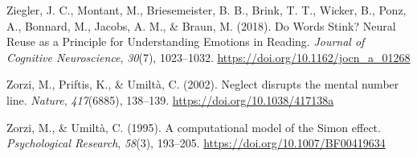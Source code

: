 \documentclass[
  a4paper,12pt,twoside,onecolumn,openright,final,oldfontcommands]{memoir}
\newlength{\cslhangindent}
\newlength{\cslentryspacingunit} %
\newenvironment{CSLReferences}[2] %
 {%
  \setlength{\parindent}{0pt}
  \ifodd #1
  \let\oldpar\par
  \def\par{\hangindent=\cslhangindent\oldpar}
  \fi
  \setlength{\parskip}{#2\cslentryspacingunit}
 }%
 {}
\begin{document}
\begin{CSLReferences}{1}{0}
\leavevmode{}%
Ziegler, J. C., Montant, M., Briesemeister, B. B., Brink, T. T., Wicker, B., Ponz, A., Bonnard, M., Jacobs, A. M., \& Braun, M. (2018). Do {Words} {Stink}? {Neural} {Reuse} as a {Principle} for {Understanding} {Emotions} in {Reading}. \emph{Journal of Cognitive Neuroscience}, \emph{30}(7), 1023--1032. \url{https://doi.org/10.1162/jocn_a_01268}

\leavevmode{}%
Zorzi, M., Priftis, K., \& Umiltà, C. (2002). Neglect disrupts the mental number line. \emph{Nature}, \emph{417}(6885), 138--139. \url{https://doi.org/10.1038/417138a}

\leavevmode{}%
Zorzi, M., \& Umiltà, C. (1995). A computational model of the {Simon} effect. \emph{Psychological Research}, \emph{58}(3), 193--205. \url{https://doi.org/10.1007/BF00419634}

\end{CSLReferences}
\end{document}
